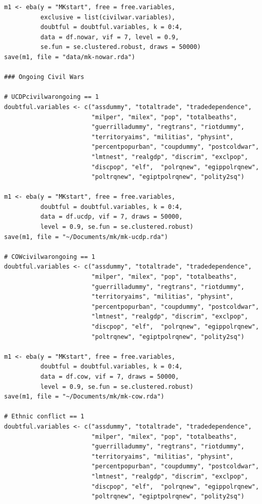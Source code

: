 \begin{verbatim}
m1 <- eba(y = "MKstart", free = free.variables,
          exclusive = list(civilwar.variables),
          doubtful = doubtful.variables, k = 0:4,
          data = df.nowar, vif = 7, level = 0.9, 
          se.fun = se.clustered.robust, draws = 50000)
save(m1, file = "data/mk-nowar.rda")

### Ongoing Civil Wars

# UCDPcivilwarongoing == 1
doubtful.variables <- c("assdummy", "totaltrade", "tradedependence",
                        "milper", "milex", "pop", "totalbeaths",
                        "guerrilladummy", "regtrans", "riotdummy",
                        "territoryaims", "militias", "physint",
                        "percentpopurban", "coupdummy", "postcoldwar",
                        "lmtnest", "realgdp", "discrim", "exclpop",
                        "discpop", "elf",  "polrqnew", "egippolrqnew",
                        "poltrqnew", "egiptpolrqnew", "polity2sq")

m1 <- eba(y = "MKstart", free = free.variables,
          doubtful = doubtful.variables, k = 0:4,
          data = df.ucdp, vif = 7, draws = 50000,
          level = 0.9, se.fun = se.clustered.robust)
save(m1, file = "~/Documents/mk/mk-ucdp.rda")

# COWcivilwarongoing == 1
doubtful.variables <- c("assdummy", "totaltrade", "tradedependence",
                        "milper", "milex", "pop", "totalbeaths",
                        "guerrilladummy", "regtrans", "riotdummy",
                        "territoryaims", "militias", "physint",
                        "percentpopurban", "coupdummy", "postcoldwar",
                        "lmtnest", "realgdp", "discrim", "exclpop",
                        "discpop", "elf",  "polrqnew", "egippolrqnew",
                        "poltrqnew", "egiptpolrqnew", "polity2sq")

m1 <- eba(y = "MKstart", free = free.variables,
          doubtful = doubtful.variables, k = 0:4,
          data = df.cow, vif = 7, draws = 50000,
          level = 0.9, se.fun = se.clustered.robust)
save(m1, file = "~/Documents/mk/mk-cow.rda")

# Ethnic conflict == 1
doubtful.variables <- c("assdummy", "totaltrade", "tradedependence",
                        "milper", "milex", "pop", "totalbeaths",
                        "guerrilladummy", "regtrans", "riotdummy",
                        "territoryaims", "militias", "physint",
                        "percentpopurban", "coupdummy", "postcoldwar",
                        "lmtnest", "realgdp", "discrim", "exclpop", 
                        "discpop", "elf",  "polrqnew", "egippolrqnew",
                        "poltrqnew", "egiptpolrqnew", "polity2sq")


\end{verbatim}
